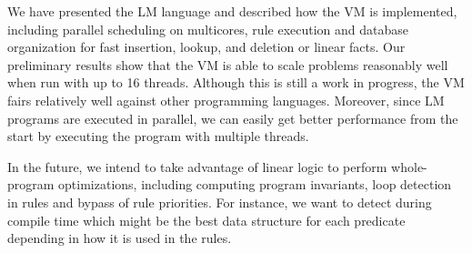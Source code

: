 We have presented the LM language and described how the VM is implemented, including
parallel scheduling on multicores, rule execution and database organization for fast insertion,
lookup, and deletion or linear facts.
Our preliminary results show that the VM is able to scale problems reasonably well when run with up to 16 threads.
Although this is still a work in progress, the VM fairs relatively well against other programming languages.
Moreover, since LM programs are executed in parallel, we can easily get better performance from the start by executing
the program with multiple threads.

In the future, we intend to take advantage of linear logic to perform whole-program optimizations,
including computing program invariants, loop detection in rules and bypass of rule priorities. For instance,
we want to detect during compile time which might be the best data structure for each predicate depending in how it
is used in the rules.